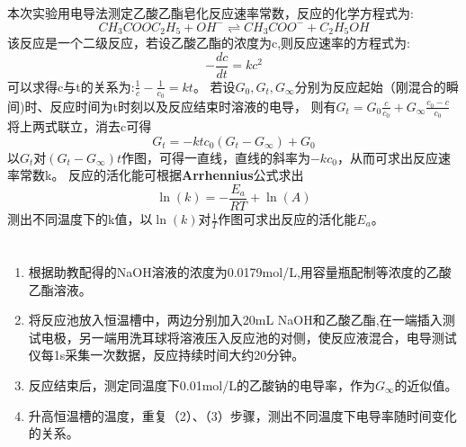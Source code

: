 ﻿\documentclass[10.5pt]{ctexart}
\begin{document}
\title{\textbf{}} %
\author{}
\date{}
\maketitle
\section{\textbf{}}
本次实验用电导法测定乙酸乙酯皂化反应速率常数，反应的化学方程式为:
\begin{equation}
CH_3COOC_2H_5+OH^-\rightleftharpoons CH_3COO^-+C_2H_5OH
\end{equation}
该反应是一个二级反应，若设乙酸乙酯的浓度为c,则反应速率的方程式为:
\begin{equation}
-\frac{d c}{dt}=kc^2
\end{equation}
可以求得c与t的关系为:$\frac{1}{c}-\frac{1}{c_0}=kt$。
若设$G_0,G_t,G_{\infty}$分别为反应起始（刚混合的瞬间)时、反应时间为t时刻以及反应结束时溶液的电导，
则有$G_t=G_0 \frac{c}{c_0}+G_{\infty} \frac{c_0-c}{c_0}$\\
将上两式联立，消去c可得
\begin{equation}
G_t=-ktc_0(G_t-G_{\infty})+G_0
\end{equation}
以$G_t$对$(G_t-G_{\infty})t$作图，可得一直线，直线的斜率为$-kc_0$，从而可求出反应速率常数k。
反应的活化能可根据\textbf{Arrhennius}公式求出
\begin{equation}
\ln(k)=-\frac{E_a}{RT}+\ln(A)
\end{equation}
测出不同温度下的k值，以$\ln(k)$对$\frac{1}{T}$作图可求出反应的活化能$E_a$。
\section{\textbf{}}

\subsection{\textbf{}}
\begin{enumerate}
\item 根据助教配得的NaOH溶液的浓度为0.0179mol/L,用容量瓶配制等浓度的乙酸乙酯溶液。
\item 将反应池放入恒温槽中，两边分别加入20mL NaOH和乙酸乙酯,在一端插入测试电极，另一端用洗耳球将溶液压入反应池的对侧，使反应液混合，电导测试仪每1s采集一次数据，反应持续时间大约20分钟。
\item 反应结束后，测定同温度下0.01mol/L的乙酸钠的电导率，作为$G_{\infty}$的近似值。
\item 升高恒温槽的温度，重复（2）、（3）步骤，测出不同温度下电导率随时间变化的关系。
\end{enumerate}
\end{document}
